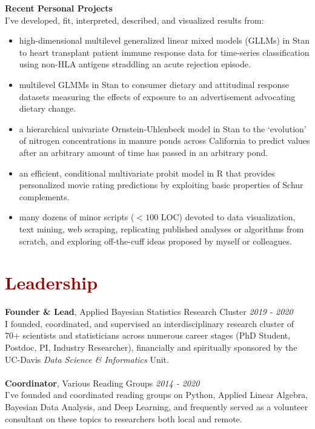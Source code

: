 \documentclass[11pt,margin,line]{resume}
\begin{document}
\begin{resume}
\textbf{Recent Personal Projects}\\
I've developed, fit, interpreted, described, and visualized results from:
\begin{itemize}[noitemsep]
\item high-dimensional multilevel generalized linear mixed models (GLLMs) in Stan to heart transplant patient immune response data for time-series classification using non-HLA antigens straddling an acute rejection episode.
\item multilevel GLMMs in Stan to consumer dietary and attitudinal response datasets measuring the effects of exposure to an advertisement advocating dietary change.
\item a hierarchical univariate Ornstein-Uhlenbeck model in Stan to the `evolution' of nitrogen concentrations in manure ponds across California to predict values after an arbitrary amount of time has passed in an arbitrary pond.
\item an efficient, conditional multivariate probit model in R that provides personalized movie rating predictions by exploiting basic properties of Schur complements.
\item many dozens of minor scripts ($<100$ LOC) devoted to data visualization, text mining, web scraping, replicating published analyses or algorithms from scratch, and exploring off-the-cuff ideas proposed by myself or colleagues.
\end{itemize}
\vspace{-1.5mm}

\section{\large\textcolor{DarkRed}{Leadership}}

\textbf{Founder \& Lead}, Applied Bayesian Statistics Research Cluster \hfill \emph{2019 - 2020}\\
I founded, coordinated, and supervised an interdisciplinary research cluster of 70+ scientists and statisticians across numerous career stages (PhD Student, Postdoc, PI, Industry Researcher), financially and spiritually sponsored by the UC-Davis \emph{Data Science \& Informatics} Unit.\\\\
\textbf{Coordinator}, Various Reading Groups \hfill \emph{2014 - 2020}\\
I've founded and coordinated reading groups on Python, Applied Linear Algebra, Bayesian Data Analysis, and Deep Learning, and frequently served as a volunteer consultant on these topics to researchers both local and remote.
\vspace{-1.5mm}


\end{resume}
\end{document}
